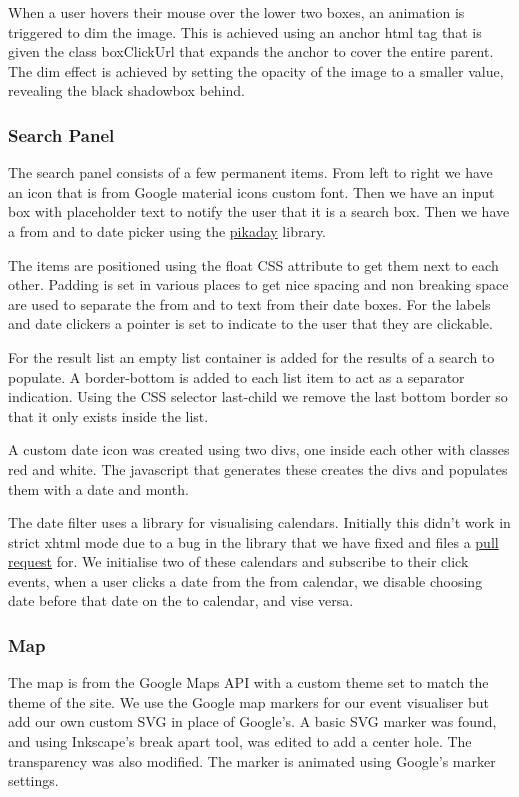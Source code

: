 \documentclass[10pt]{article}
\begin{document}
                When a user hovers their mouse over the lower two boxes, an animation is triggered to dim the image. This is achieved using an anchor html tag that is given the class boxClickUrl that expands the anchor to cover the entire parent. The dim effect is achieved by setting the opacity of the image to a smaller value, revealing the black shadowbox behind.

            \subsubsection{Search Panel}
                The search panel consists of a few permanent items. From left to right we have an icon that is from Google material icons custom font. Then we have an input box with placeholder text to notify the user that it is a search box. Then we have a from and to date picker using the \href{https://github.com/dbushell/Pikaday}{pikaday} library.

                The items are positioned using the float CSS attribute to get them next to each other. Padding is set in various places to get nice spacing and non breaking space are used to separate the from and to text from their date boxes. For the labels and date clickers a pointer is set to indicate to the user that they are clickable.

                For the result list an empty list container is added for the results of a search to populate. A border-bottom is added to each list item to act as a separator indication. Using the CSS selector last-child we remove the last bottom border so that it only exists inside the list.

                A custom date icon was created using two divs, one inside each other with classes red and white. The javascript that generates these creates the divs and populates them with a date and month.

                The date filter uses a library for visualising calendars. Initially this didn't work in strict xhtml mode due to a bug in the library that we have fixed and files a \href{https://github.com/dbushell/Pikaday/pull/526}{pull request} for. We initialise two of these calendars and subscribe to their click events, when a user clicks a date from the from calendar, we disable choosing date before that date on the to calendar, and vise versa.

            \subsubsection{Map}
                The map is from the Google Maps API with a custom theme set to match the theme of the site. We use the Google map markers for our event visualiser but add our own custom SVG in place of Google's. A basic SVG marker was found, and using Inkscape's break apart tool, was edited to add a center hole. The transparency was also modified. The marker is animated using Google's marker settings.
\end{document}
